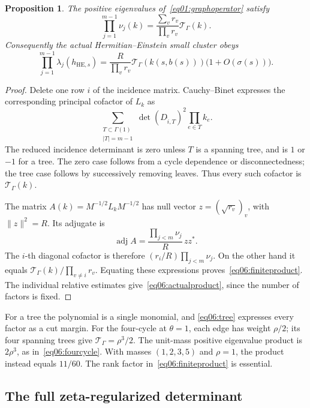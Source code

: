 \documentclass[11pt]{amsart}
\newtheorem{proposition}[theorem]{Proposition}
\theoremstyle{definition}
\theoremstyle{remark}
\begin{document}
\begin{proposition}\label{prop06:product}
The positive eigenvalues of~\eqref{eq01:graphoperator} satisfy
\begin{equation}\label{eq06:finiteproduct}
 \prod_{j=1}^{m-1}\nu_j(k)
 =\frac{\sum_vr_v}{\prod_vr_v}\mathcal T_\Gamma(k).
\end{equation}
Consequently the actual Hermitian--Einstein small cluster obeys
\begin{equation}\label{eq06:actualproduct}
 \prod_{j=1}^{m-1}\lambda_j(h_{\mathrm{HE},s})
 =\frac{R}{\prod_vr_v}\mathcal T_\Gamma(k(s,b(s)))
                         \bigl(1+O(\sigma(s))\bigr).
\end{equation}
\end{proposition}

\begin{proof}
Delete one row \(i\) of the incidence matrix. Cauchy--Binet
expresses the corresponding principal cofactor of \(L_k\) as
\[
 \sum_{\substack{T\subset\Gamma(1)\\|T|=m-1}}
       \det(D_{\widehat i,T})^2\prod_{e\in T}k_e.
\]
The reduced incidence determinant is zero unless \(T\) is a
spanning tree, and is \(1\) or \(-1\) for a tree. The zero
case follows from a cycle dependence or disconnectedness;
the tree case follows by successively removing leaves.
Thus every such cofactor is \(\mathcal T_\Gamma(k)\).

The matrix \(A(k)=M^{-1/2}L_kM^{-1/2}\) has null vector
\(z=(\sqrt{r_v})_v\), with \(\|z\|^2=R\).
Its adjugate is
\[
 \operatorname{adj} A
 =\frac{\prod_{j<m}\nu_j}{R}\,zz^*.
\]
The \(i\)-th diagonal cofactor is therefore
\((r_i/R)\prod_{j<m}\nu_j\). On the other hand it equals
\(\mathcal T_\Gamma(k)/\prod_{v\ne i}r_v\).
Equating these expressions proves~\eqref{eq06:finiteproduct}.
The individual relative estimates give~\eqref{eq06:actualproduct},
since the number of factors is fixed.
\end{proof}

For a tree the polynomial is a single monomial, and
\eqref{eq06:tree} expresses every factor as a cut margin.
For the four-cycle at \(\theta=1\), each edge has weight
\(\rho/2\); its four spanning trees give
\(\mathcal T_\Gamma=\rho^3/2\).
The unit-mass positive eigenvalue product is \(2\rho^3\),
as in~\eqref{eq06:fourcycle}. With masses \((1,2,3,5)\)
and \(\rho=1\), the product instead equals \(11/60\).
The rank factor in~\eqref{eq06:finiteproduct} is essential.

\subsection{The full zeta-regularized determinant}
\end{document}
